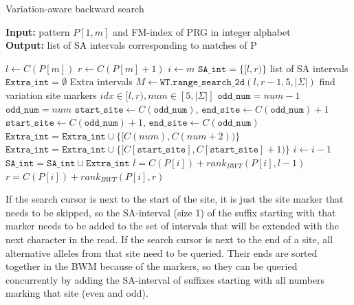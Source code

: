 \documentclass[runningheads,a4paper]{llncs}
\begin{document}
\begin{algorithm}[H]
\caption{Variation-aware backward search} \label{bsearch}
\textbf{Input:} \textrm{pattern} $P[1,m]$ \textrm{and FM-index of PRG in integer alphabet}\\
\textbf{Output:} \textrm{list of SA intervals corresponding to matches of P} 
\begin{algorithmic}[1]
\State $l \gets C(P[m])$
\State $r \gets C(P[m]+1)$
\State $i \gets m$
\State $\texttt{SA\char`_int}=\{[l,r)\}$ \Comment list of SA intervals
\State $\texttt{Extra\char`_int}=\emptyset$   \Comment Extra intervals
\ForAll {$[l,r) \in \texttt{SA\char`_int}$} 
\State $M \gets \texttt{WT.range\char`_search\char`_2d} (l,r-1,5,|\Sigma|)$ \Comment find variation site markers
  \Comment $ idx\in [l,r), num\in[5,|\Sigma|]$
\State $\texttt{odd\char`_num}=num-1$
\Else
\State $\texttt{odd\char`_num}=num$
\EndIf
{}
\State $\texttt{start\char`_site} \gets C(\texttt{odd\char`_num})$, $\texttt{end\char`_site} \gets C(\texttt{odd\char`_num})+1$
\Else 
\State $\texttt{start\char`_site} \gets C(\texttt{odd\char`_num})+1$, $\texttt{end\char`_site} \gets C(\texttt{odd\char`_num})$
\EndIf
{}
\State $\texttt{Extra\char`_int}=\texttt{Extra\char`_int} \cup \{[C(num),C(num+2))\}$
\Else
\State $\texttt{Extra\char`_int}=\texttt{Extra\char`_int} \cup \{[C[\texttt{start\char`_site}], C[\texttt{start\char`_site}]+1)\}$
\EndIf
\EndFor
\EndFor
\State $i \gets i-1$
\State $\texttt{SA\char`_int}=\texttt{SA\char`_int} \cup \texttt{Extra\char`_int}$
\ForAll {$[l,r) \in \texttt{SA\char`_int}$} 
\State $l=C(P[i])+rank_{BWT}(P[i],l-1)$
\State $r=C(P[i])+rank_{BWT}(P[i],r)$
\EndFor
\EndWhile
\end {algorithmic}
\end{algorithm}


If the search cursor is next to the start of the site, it is just the site marker that needs to be skipped, so the SA-interval (size 1) of the suffix starting with that marker needs to be added to the set of intervals that will be extended with the next character in the read. If the search cursor is next to the end of a site, all alternative alleles from that site need to be queried. Their ends are sorted together in the BWM because of the markers, so they can be queried concurrently by adding the SA-interval of suffixes starting with all numbers marking that site (even and odd). 
\end{document}
